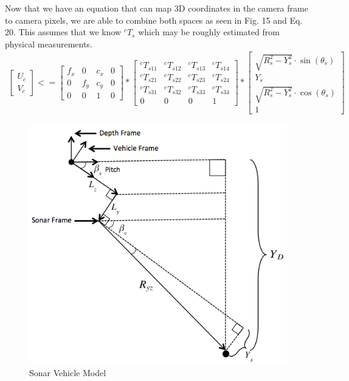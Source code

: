 \documentclass[15pt]{article}
\begin{document}
Now that we have an equation that can map 3D coordinates in the camera frame to camera pixels, we are able to combine both spaces as seen in Fig. 15 and Eq. 20. This assumes that we know $^{c}T_{s}$ which may be roughly estimated from physical measurements. 
\begin{gather}
\left[\begin{array}{c}
U_{c}\\
V_{c}
\end{array}\right]<=\left[\begin{array}{cccc}
f_{x} & 0 & c_{x} & 0\\
0 & f_{y} & c_{y} & 0\\
0 & 0 & 1 & 0
\end{array}\right]*
\left[\begin{array}{cccc}
^{c}T_{s11} & ^{c}T_{s12} & ^{c}T_{s13} & ^{c}T_{s14}\\
^{c}T_{s21} & ^{c}T_{s22} & ^{c}T_{s23} & ^{c}T_{s24}\\
^{c}T_{s31} & ^{c}T_{s32} & ^{c}T_{s33} & ^{c}T_{s34}\\
0 & 0 & 0 & 1
\end{array}\right]
*\left[\begin{array}{c}
\sqrt{R_{s}^{2}-Y_{s}^{2}}\cdot\sin\left(\theta_{s}\right)\\
Y_{s}\\
\sqrt{R_{s}^{2}-Y_{s}^{2}}\cdot\cos\left(\theta_{s}\right)\\
1
\end{array}\right]
\end{gather}

\begin{figure}[h!]
  \centering
  \includegraphics[scale=0.4]{sonarvehframe}
  \captionsetup{justification=centering}
  \caption{Sonar Vehicle Model}
\end{figure}
\end{document}
